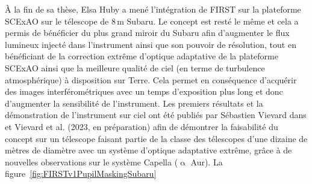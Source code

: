 À la fin de sa thèse, Elsa Huby a mené l'intégration de \ac{FIRST} sur la plateforme \ac{SCExAO} sur le télescope de $8 \,$m Subaru. Le concept est resté le même et cela a permis de bénéficier du plus grand miroir du Subaru afin d'augmenter le flux lumineux injecté dans l'instrument ainsi que son pouvoir de résolution, tout en bénéficiant de la correction extrême d'optique adaptative de la plateforme \ac{SCExAO} ainsi que la meilleure qualité de ciel (en terme de turbulence atmosphérique) à disposition sur Terre. Cela permet en conséquence d'acquérir des images interférométriques avec un temps d'exposition plus long et donc d'augmenter la sensibilité de l'instrument. Les premiers résultats et la démonstration de l'instrument sur ciel ont été publiés par Sébastien Vievard dans \cite{vievard2020a} et Vievard et al. (2023, en préparation) afin de démontrer la faisabilité du concept sur un télescope faisant partie de la classe des télescopes d'une dizaine de mètres de diamètre avec un système d'optique adaptative extrême, grâce à de nouvelles observations sur le système Capella ($\upalpha$ Aur). La figure~\ref{fig:FIRSTv1PupilMaskingSubaru}

